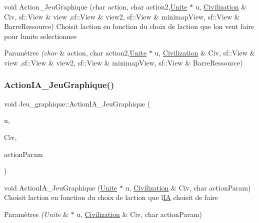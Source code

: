 void Action\+\_\+\+Jeu\+Graphique (char action, char action2,\hyperlink{classUnite}{Unite} $\ast$ u, \hyperlink{classCivilization}{Civilization} \& Civ, sf\+::\+View \& view ,sf\+::\+View \& view2, sf\+::\+View \& minimap\+View, sf\+::\+View \& Barre\+Ressource) Choisit l\textquotesingle{}action en fonction du choix de l\textquotesingle{}action que l\textquotesingle{}on veut faire pour l\textquotesingle{}unite selectionnee 


\begin{DoxyParams}{Paramètres}
{\em (char} & action, char action2,\hyperlink{classUnite}{Unite} $\ast$ u, \hyperlink{classCivilization}{Civilization} \& Civ, sf\+::\+View \& view ,sf\+::\+View \& view2, sf\+::\+View \& minimap\+View, sf\+::\+View \& Barre\+Ressource) \\
\hline
\end{DoxyParams}
\mbox{\label{classJeu__graphique_aaa032d88ed8052f9a47fe83dd8e100c2}} 
\subsubsection{\texorpdfstring{Action\+I\+A\+\_\+\+Jeu\+Graphique()}{ActionIA\_JeuGraphique()}}
{\footnotesize\ttfamily void Jeu\+\_\+graphique\+::\+Action\+I\+A\+\_\+\+Jeu\+Graphique (\begin{DoxyParamCaption}\item[{\hyperlink{classUnite}{Unite} $\ast$}]{u,  }\item[{\hyperlink{classCivilization}{Civilization} \&}]{Civ,  }\item[{char}]{action\+Param }\end{DoxyParamCaption})}



void Action\+I\+A\+\_\+\+Jeu\+Graphique (\hyperlink{classUnite}{Unite} $\ast$ u, \hyperlink{classCivilization}{Civilization} \& Civ, char action\+Param) Choisit l\textquotesingle{}action en fonction du choix de l\textquotesingle{}action que l\textquotesingle{}\hyperlink{classIA}{IA} choisit de faire 


\begin{DoxyParams}{Paramètres}
{\em (\+Unite} & $\ast$ u, \hyperlink{classCivilization}{Civilization} \& Civ, char action\+Param) \\
\hline
\end{DoxyParams}
\mbox{\label{classJeu__graphique_a988f0ef9417b30872257d7b1396b6fc0}} 
